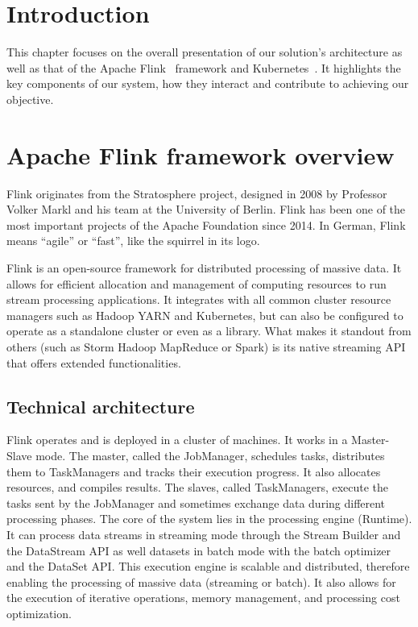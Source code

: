 \section{Introduction}
This chapter focuses on the overall presentation of our solution's architecture as well as that of the Apache Flink~\cite{FLINK} framework and Kubernetes~\cite{K8S}.
It highlights the key components of our system, how they interact and contribute to achieving our objective.

\section{Apache Flink framework overview}
Flink originates from the Stratosphere project, designed in 2008 by Professor Volker Markl and his team at the University of Berlin.
Flink has been one of the most important projects of the Apache Foundation since 2014.
In German, Flink means ``agile'' or ``fast'', like the squirrel in its logo.

Flink is an open-source framework for distributed processing of massive data.
It allows for efficient allocation and management of computing resources to run stream processing applications.
It integrates with all common cluster resource managers such as Hadoop YARN and Kubernetes, but can also be configured to operate as a standalone cluster or even as a library.
What makes it standout from others (such as Storm Hadoop MapReduce or Spark) is its native streaming API that offers extended functionalities.

\subsection{Technical architecture}
Flink operates and is deployed in a cluster of machines.
It works in a Master-Slave mode.
The master, called the JobManager, schedules tasks, distributes them to TaskManagers and tracks their execution progress.
It also allocates resources, and compiles results.
The slaves, called TaskManagers, execute the tasks sent by the JobManager and sometimes exchange data during different processing phases.
The core of the system lies in the processing engine (Runtime).
It can process data streams in streaming mode through the Stream Builder and the DataStream API as well datasets in batch mode with the batch optimizer and the DataSet API\@.
This execution engine is scalable and distributed, therefore enabling the processing of massive data (streaming or batch).
It also allows for the execution of iterative operations, memory management, and processing cost optimization.

